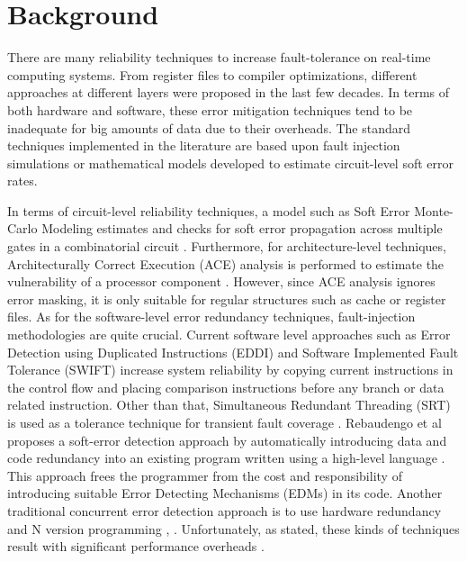 \section{Background}\label{sec:background}

There are many reliability techniques to increase fault-tolerance on real-time computing systems. From register files to compiler optimizations, different approaches at different layers were proposed in the last few decades. In terms of both hardware and software, these error mitigation techniques tend to be inadequate for big amounts of data due to their overheads. The standard techniques implemented in the literature are based upon fault injection simulations \cite{Fault_Injection_Simulation:2010} or mathematical models \cite{Monte_Carlo:1996} developed to estimate circuit-level soft error rates. 

In terms of circuit-level reliability techniques, a model such as Soft Error Monte-Carlo Modeling estimates and checks for soft error propagation across multiple gates in a combinatorial circuit \cite{Monte_Carlo:1996}. Furthermore, for architecture-level techniques, Architecturally Correct Execution (ACE) analysis is performed to estimate the vulnerability of a processor component \cite{ACE:2003}. However, since ACE analysis ignores error masking, it is only suitable for regular structures such as cache or register files. As for the software-level error redundancy techniques, fault-injection methodologies are quite crucial. Current software level approaches such as Error Detection using Duplicated Instructions (EDDI) \cite{EDDI:2002} and Software Implemented Fault Tolerance (SWIFT) \cite{SWIFT:2005} increase system reliability by copying current instructions in the control flow and placing comparison instructions before any branch or data related instruction. Other than that, Simultaneous Redundant Threading (SRT) is used as a tolerance technique for transient fault coverage \cite{SRT:2000}. Rebaudengo et al proposes a soft-error detection approach by automatically introducing data and code redundancy into an existing program written using a high-level language \cite{Rebaudengo:1999}. This approach frees the programmer from the cost and responsibility of introducing suitable Error Detecting Mechanisms (EDMs) in its code. Another traditional concurrent error detection approach is to use hardware redundancy and N version programming \cite{FTMP:1978}, \cite{Avizienis:1985}. Unfortunately, as stated, these kinds of techniques result with significant performance overheads \cite{Gupta:2016}. 

